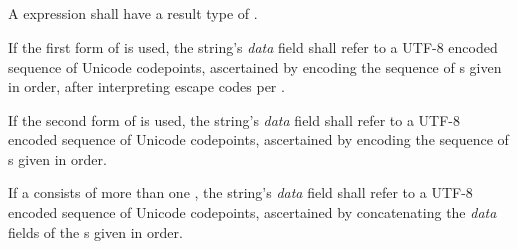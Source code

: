 \begin{grammar}
 \\
	  \\

 \exactly \\
	   \\
	\terminal{\textasciigrave}  \terminal{\textasciigrave} \\

 \exactly \\
	  \\

 \\
	 \\
	 \\

 \exactly \\
	  \\

 \\
	 \\
\end{grammar}

\specsubsubitem
A  expression shall have a result type of
 .

\specsubsubitem
If the first form of  is used, the string's
\textit{data} field shall refer to a \hbox{UTF-8} encoded sequence of Unicode
codepoints, ascertained by encoding the sequence of s
given in order, after interpreting escape codes per
.

\specsubsubitem
If the second form of  is used, the string's
\textit{data} field shall refer to a \hbox{UTF-8} encoded sequence of Unicode
codepoints, ascertained by encoding the sequence of
s given in order.

\specsubsubitem
If a  consists of more than one
, the string's \textit{data} field shall refer to
a \hbox{UTF-8} encoded sequence of Unicode codepoints, ascertained by
concatenating the \textit{data} fields of the s
given in order.

